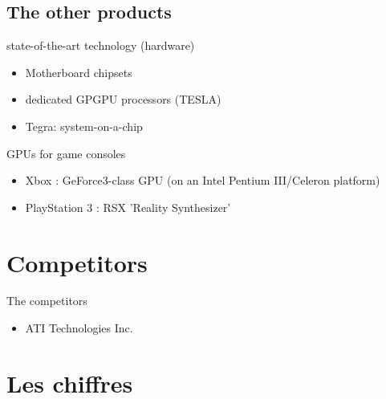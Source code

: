 \documentclass{beamer}
\begin{document}
\subsection{The other products}
\begin{frame}{}
	\transdissolve[duration=0.1]
	\begin{block}{state-of-the-art technology (hardware)}
		\begin{itemize}
			\item<+->{Motherboard chipsets}
			\item<+->{dedicated GPGPU processors (TESLA)}
			\item<+->{Tegra: system-on-a-chip}
		\end{itemize}
	\end{block}
	\begin{block}{GPUs for game consoles}
		\begin{itemize}
			\item<+->{Xbox : GeForce3-class GPU (on an Intel Pentium III/Celeron platform)}
			\item<+->{PlayStation 3 : RSX 'Reality Synthesizer'}
		\end{itemize}
	\end{block}
\end{frame}

\section{Competitors}
\begin{frame}{The competitors}
	\transdissolve[duration=0.1]
	\begin{block}{}
		\begin{itemize}
			\item<+->{ATI Technologies Inc.}
		\end{itemize}
	\end{block}
\end{frame}

\section{Les chiffres}
\end{document}
